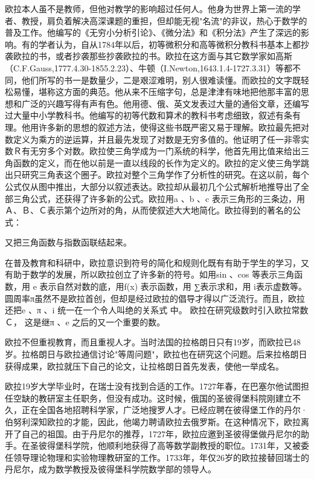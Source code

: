 \documentclass[UTF8]{ctexbook}
\begin{document}
欧拉本人虽不是教师，但他对教学的影响超过任何人。他身为世界上第一流的学者、教授，肩负着解决高深课题的重担，但却能无视"名流"的非议，热心于数学的普及工作。他编写的《无穷小分析引论》、《微分法》和《积分法》产生了深远的影响。有的学者认为，自从1784年以后，初等微积分和高等微积分教科书基本上都抄袭欧拉的书，或者抄袭那些抄袭欧拉的书。欧拉在这方面与其它数学家如高斯（C.F.Gauss,1777.4.30-1855.2.23）、牛顿（I.Newton,1643.1.4-1727.3.31）等都不同，他们所写的书一是数量少，二是艰涩难明，别人很难读懂。而欧拉的文字既轻松易懂，堪称这方面的典范。他从来不压缩字句，总是津津有味地把他那丰富的思想和广泛的兴趣写得有声有色。他用德、俄、英文发表过大量的通俗文章，还编写过大量中小学教科书。他编写的初等代数和算术的教科书考虑细致，叙述有条有理。他用许多新的思想的叙述方法，使得这些书既严密又易于理解。欧拉最先把对数定义为乘方的逆运算，并且最先发现了对数是无穷多值的。他证明了任一非零实数Ｒ有无穷多个对数。欧拉使三角学成为一门系统的科学，他首先用比值来给出三角函数的定义，而在他以前是一直以线段的长作为定义的。欧拉的定义使三角学跳出只研究三角表这个圈子。欧拉对整个三角学作了分析性的研究。在这以前，每个公式仅从图中推出，大部分以叙述表达。欧拉却从最初几个公式解析地推导出了全部三角公式，还获得了许多新的公式。欧拉用a 、b 、c 表示三角形的三条边，用Ａ、Ｂ、Ｃ表示第个边所对的角，从而使叙述大大地简化。欧拉得到的著名的公式：

又把三角函数与指数函联结起来。

在普及教育和科研中，欧拉意识到符号的简化和规则化既有有助于学生的学习，又有助于数学的发展，所以欧拉创立了许多新的符号。如用sin 、cos 等表示三角函数，用 e 表示自然对数的底，用f(x) 表示函数，用 ∑表示求和，用 i表示虚数等。圆周率π虽然不是欧拉首创，但却是经过欧拉的倡导才得以广泛流行。而且，欧拉还把e 、π 、i 统一在一个令人叫绝的关系式 中。 欧拉在研究级数时引入欧拉常数Ｃ， 这是继π 、e 之后的又一个重要的数。

欧拉不但重视教育，而且重视人才。当时法国的拉格朗日只有19岁，而欧拉已48岁。拉格朗日与欧拉通信讨论"等周问题"，欧拉也在研究这个问题。后来拉格朗日获得成果，欧拉就压下自己的论文，让拉格朗日首先发表，使他一举成名。

欧拉19岁大学毕业时，在瑞士没有找到合适的工作。1727年春，在巴塞尔他试图担任空缺的教研室主任职务，但没有成功。这时候，俄国的圣彼得堡科院刚建立不久，正在全国各地招聘科学家，广泛地搜罗人才。已经应聘在彼得堡工作的丹尔·伯努利深知欧拉的才能，因此，他竭力聘请欧拉去俄罗斯。在这种情况下，欧拉离开了自己的祖国。由于丹尼尔的推荐，1727年，欧拉应邀到圣彼得堡做丹尼尔的助手。在圣彼得堡科学院，他顺利地获得了高等数学副教授的职位。1731年，又被委任领导理论物理和实验物理教研室的工作。1733年，年仅26岁的欧拉接替回瑞士的丹尼尔，成为数学教授及彼得堡科学院数学部的领导人。
\end{document}
